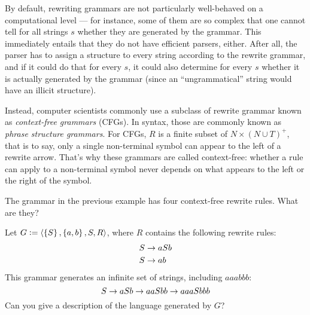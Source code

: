 By default, rewriting grammars are not particularly well-behaved on a computational level --- for instance, some of them are so complex that one cannot tell for all strings $s$ whether they are generated by the grammar.
This immediately entails that they do not have efficient parsers, either.
After all, the parser has to assign a structure to every string according to the rewrite grammar, and if it could do that for every $s$, it could also determine for every $s$ whether it is actually generated by the grammar (since an ``ungrammatical'' string would have an illicit structure).

Instead, computer scientists commonly use a subclass of rewrite grammar known as \emph{context-free grammars} (CFGs).
In syntax, those are commonly known as \emph{phrase structure grammars}.
For CFGs, $R$ is a finite subset of $N \times (N \cup T)^+$, that is to say, only a single non-terminal symbol can appear to the left of a rewrite arrow.
That's why these grammars are called context-free: whether a rule can apply to a non-terminal symbol never depends on what appears to the left or the right of the symbol.
%
\begin{exercise}
    The grammar in the previous example has four context-free rewrite rules.
    What are they?
\end{exercise}
%
\begin{examplebox}
    Let $G \mathrel{\mathop:}= \left \langle 
            \left \{ S \right \},
            \left \{ a,b \right \},
            S,
            R \right \rangle $,
    where $R$ contains the following rewrite rules:
    \begin{align*}
        S &\rightarrow aSb\\
        S &\rightarrow ab
    \end{align*}
    This grammar generates an infinite set of strings, including $aaabbb$:
    \[
        S
        \rightarrow aSb
        \rightarrow aaSbb
        \rightarrow aaaSbbb
    \]
    Can you give a description of the language generated by $G$?
\end{examplebox}

